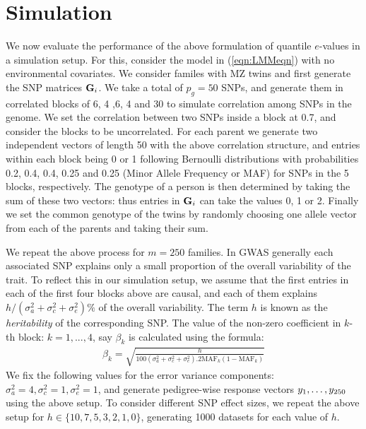 \section{Simulation}
\label{sec:SimSection}

We now evaluate the performance of the above formulation of quantile $e$-values in a simulation setup. For this, consider the model in (\ref{eqn:LMMeqn}) with no environmental covariates. We consider familes with MZ twins and first generate the SNP matrices ${\mathbf{G}}_i$. We take a total of $p_g = 50$ SNPs, and generate them in correlated blocks of 6, 4 ,6, 4 and 30 to simulate correlation among SNPs in the genome. We set the correlation between two SNPs inside a block at 0.7, and consider the blocks to be uncorrelated. For each parent we generate two independent vectors of length 50 with the above correlation structure, and entries within each block being 0 or 1 following Bernoulli distributions with probabilities 0.2, 0.4, 0.4, 0.25 and 0.25 (Minor Allele Frequency or MAF) for SNPs in the 5 blocks, respectively. The genotype of a person is then determined by taking the sum of these two vectors: thus entries in ${\mathbf{G}}_i$ can take the values 0, 1 or 2. Finally we set the common genotype of the twins by randomly choosing one allele vector from each of the parents and taking their sum.


We repeat the above process for $m=250$ families. In GWAS generally each associated SNP explains only a small proportion of the overall variability of the trait. To reflect this in our simulation setup, we assume that the first entries in each of the first four blocks above are causal, and each of them explains $h/(\sigma_a^2+\sigma_c^2+\sigma_e^2) \%$ of the overall variability. The term $h$ is known as the \textit{heritability} of the corresponding SNP. The value of the non-zero coefficient in $k$-th block: $k = 1, ..., 4$, say $\beta_k$ is calculated using the formula:
%
\begin{align}
\beta_k = \sqrt{ \frac{h}{100 (\sigma_a^2+\sigma_c^2+\sigma_e^2). 2 \text{MAF}_k (1 - \text{MAF}_k) }}
\end{align}
%
We fix the following values for the error variance components: $\sigma_a^2 = 4, \sigma_c^2 = 1, \sigma_e^2 = 1$, and generate pedigree-wise response vectors ${y}_1, \ldots, {y}_{250}$ using the above setup. To consider different SNP effect sizes, we repeat the above setup for $h \in \{10, 7, 5, 3, 2, 1, 0 \}$, generating 1000 datasets for each value of $h$.

